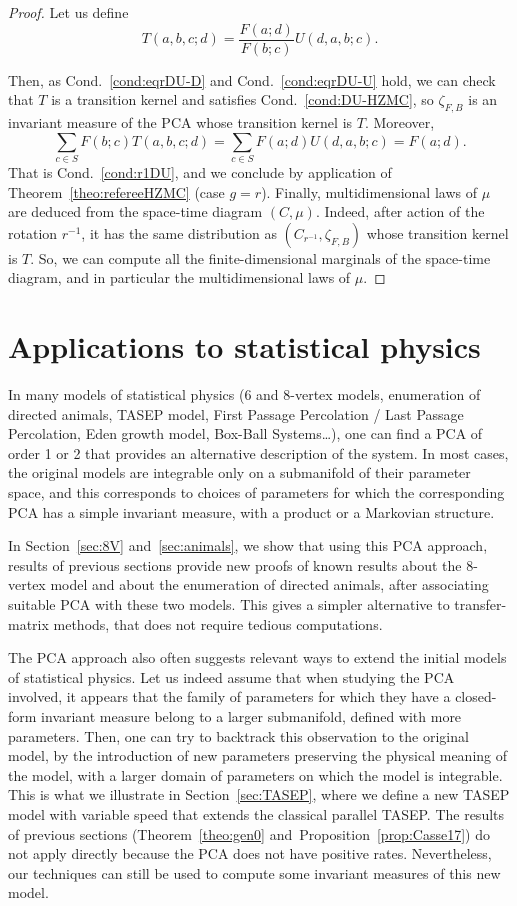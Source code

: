 \documentclass[10pt]{amsart}
\theoremstyle{definition}\newtheorem{defi}[theo]{Definition}\newtheorem{rema}[theo]{Remark}\newtheorem{exam}[theo]{Example}\newtheorem{exem}[theo]{Example}\newtheorem{nota}[theo]{Notation}
\newcounter{a}
\newcommand{\Cond}{Cond.}
\begin{document}
\begin{proof}
Let us define
\[
T(a,b,c;d) = \frac{F(a;d)}{F(b;c)}U(d,a,b;c).
\]

\goodbreak
Then, as \Cond~\ref{cond:eqrDU-D} and \Cond~\ref{cond:eqrDU-U} hold, we can check that $T$ is a transition kernel and satisfies \Cond~\ref{cond:DU-HZMC}, so $\zeta_{F,B}$ is an invariant measure of the PCA whose transition kernel is $T$. Moreover,
\[
\sum_{c\in S} F(b;c) {T}(a,b,c;d) = \sum_{c\in S} F(a;d) U(d,a,b;c) = F(a;d).
\]
That is \Cond~\ref{cond:r1DU}, and we conclude by application of Theorem~\ref{theo:refereeHZMC} (case $g=r$). Finally, multidimensional laws of $\mu$ are deduced from the space-time diagram $(C,\mu)$. Indeed, after action of the rotation $r^{-1}$, it has the same distribution as $(C_{r^{-1}},\zeta_{F,B})$ whose transition kernel is $T$. So, we can compute all the finite-dimensional marginals of the space-time diagram, and in particular the multidimensional laws of $\mu$.
\end{proof}

\section{Applications to statistical physics}\label{sec:sp}

In many models of statistical physics (6 and 8-vertex models, enumeration of directed animals, TASEP model, First Passage Percolation / Last Passage Percolation, Eden growth model, Box-Ball Systems\dots), one can find a PCA of order 1 or 2 that provides an alternative description of the system. In most cases, the original models are integrable only on a submanifold of their parameter space, and this corresponds to choices of parameters for which the corresponding PCA has a simple invariant measure, with a product or a Markovian structure.

In Section~\ref{sec:8V} and~\ref{sec:animals}, we show that using this PCA approach, results of previous sections provide new proofs of known results about the 8-vertex model and about the enumeration of directed animals, after associating suitable PCA with these two models. This gives a simpler alternative to transfer-matrix methods, that does not require tedious computations.

The PCA approach also often suggests relevant ways to extend the initial models of statistical physics. Let us indeed assume that when studying the PCA involved, it appears that the family of parameters for which they have a closed-form invariant measure belong to a larger submanifold, defined with more parameters. Then, one can try to backtrack this observation to the original model, by the introduction of new parameters preserving the physical meaning of the model, with a larger domain of parameters on which the model is integrable. This is what we illustrate in Section~\ref{sec:TASEP}, where we define a new TASEP model with variable speed that extends the classical parallel TASEP. The results of previous sections (Theorem~\ref{theo:gen0} and~Proposition~\ref{prop:Casse17}) do not apply directly because the PCA does not have positive rates. Nevertheless, our techniques can still be used to compute some invariant measures of this new model.
\end{document}

